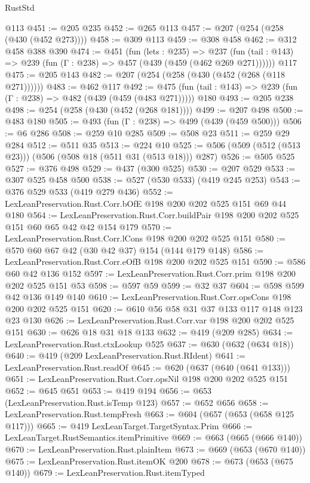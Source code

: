 \begin{lexlean}{RustStd}
\begin{coremodule}
    @113
@451 := @205 @235
@452 := @265 @113
@457 := @207 (@254 (@258 (@430 (@452 @273))))
@458 := @309 @113
@459 := @308 @458
@462 := @312 @458 @388 @390
@474 := @451
    (fun (lets : @235) =>
    @237 (fun (tail : @143) => @239 (fun (Γ : @238) => @457 (@439 (@459 (@462 @269 @271))))))
    @117
@475 := @205 @143
@482 := @207 (@254 (@258 (@430 (@452 (@268 (@118 @271))))))
@483 := @462 @117
@492 := @475 (fun (tail : @143) => @239 (fun (Γ : @238) => @482 (@439 (@459 (@483 @271))))) @180
@493 := @205 @238
@498 := @254 (@258 (@430 (@452 (@268 @181))))
@499 := @207 @498
@500 := @483 @180
@505 := @493 (fun (Γ : @238) => @499 (@439 (@459 @500)))
@506 := @6 @286
@508 := @259 @10 @285
@509 := @508 @23
@511 := @259 @29 @284
@512 := @511 @35
@513 := @224 @10
@525 := @506 (@509 (@512 (@513 @23))) (@506 (@508 @18 (@511 @31 (@513 @18))) @287)
@526 := @505 @525
@527 := @376 @498
@529 := @437 (@300 @525)
@530 := @207 @529
@533 := @307 @525 @458 @500
@538 := @527 (@530 @533) (@419 @245 @253)
@543 := @376 @529 @533 (@419 @279 @436)
@552 := LexLeanPreservation.Rust.Corr.bOfE @198 @200 @202 @525 @151 @69 @44 @180
@564 := LexLeanPreservation.Rust.Corr.buildPair @198 @200 @202 @525 @151 @60 @65 @42 @42 @154 @179
@570 := LexLeanPreservation.Rust.Corr.lCons @198 @200 @202 @525 @151
@580 := @570 @60 @67 @42 (@30 @42 @37) @154 (@144 @179 @148)
@586 := LexLeanPreservation.Rust.Corr.eOfB @198 @200 @202 @525 @151
@590 := @586 @60 @42 @136 @152
@597 := LexLeanPreservation.Rust.Corr.prim @198 @200 @202 @525 @151 @53
@598 := @597 @59
@599 := @32 @37
@604 := @598 @599 @42 @136 @149 @140
@610 := LexLeanPreservation.Rust.Corr.opsCons @198 @200 @202 @525 @151
@620 := @610 @56 @58 @31 @37 @133 @117 @148 @123 @23 @130
@626 := LexLeanPreservation.Rust.Corr.var @198 @200 @202 @525 @151
@630 := @626 @18 @31 @18 @133
@632 := @419 (@209 @285)
@634 := LexLeanPreservation.Rust.ctxLookup @525
@637 := @630 (@632 (@634 @18))
@640 := @419 (@209 LexLeanPreservation.Rust.RIdent)
@641 := LexLeanPreservation.Rust.readOf
@645 := @620 (@637 (@640 (@641 @133)))
@651 := LexLeanPreservation.Rust.Corr.opsNil @198 @200 @202 @525 @151
@652 := @645 @651
@653 := @419 @194
@656 := @653 (LexLeanPreservation.Rust.isTemp @123)
@657 := @652 @656
@658 := LexLeanPreservation.Rust.tempFresh
@663 := @604 (@657 (@653 (@658 @125 @117)))
@665 := @419 LexLeanTarget.TargetSyntax.Prim
@666 := LexLeanTarget.RustSemantics.itemPrimitive
@669 := @663 (@665 (@666 @140))
@670 := LexLeanPreservation.Rust.plainItem
@673 := @669 (@653 (@670 @140))
@675 := LexLeanPreservation.Rust.itemOK @200
@678 := @673 (@653 (@675 @140))
@679 := LexLeanPreservation.Rust.itemTyped

\end{coremodule}
\end{lexlean}

